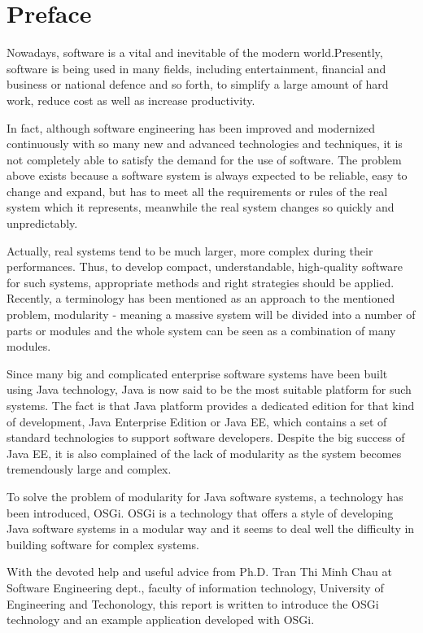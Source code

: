 \chapter*{Preface}

Nowadays, software is a vital and inevitable of the modern world.Presently, software is being used in many fields, including entertainment, financial and business or national defence and so forth, to simplify a large amount of hard work, reduce cost as well as increase productivity.

In fact, although software engineering has been improved and modernized continuously with so many new and advanced technologies and techniques, it is not completely able to satisfy the demand for the use of software. The problem above exists because a software system is always expected to be reliable, easy to change and expand, but has to meet all the requirements or rules of the real system which it represents, meanwhile the real system changes so quickly and unpredictably. 

Actually, real systems tend to be much larger, more complex during their performances. Thus, to develop compact, understandable, high-quality software for such systems, appropriate methods and right strategies should be applied. Recently, a terminology has been mentioned as an approach to the mentioned problem, modularity - meaning a massive system will be divided into a number of parts or modules and the whole system can be seen as a combination of many modules. 

Since many big and complicated enterprise software systems have been built using Java technology, Java is now said to be the most suitable platform for such systems. The fact is that Java platform provides a dedicated edition for that kind of development, Java Enterprise Edition or Java EE, which contains a set of standard technologies to support software developers. Despite the big success of Java EE, it is also complained of the lack of modularity as the system becomes tremendously large and complex.

To solve the problem of modularity for Java software systems, a technology has been introduced, OSGi. OSGi is a technology that offers a style of developing Java software systems in a modular way and it seems to deal well the difficulty in building software for complex systems.
 
With the devoted help and useful advice from Ph.D. Tran Thi Minh Chau at Software Engineering dept., faculty of information technology, University of Engineering and Techonology, this report is written to introduce the OSGi technology and an example application developed with OSGi.
   


